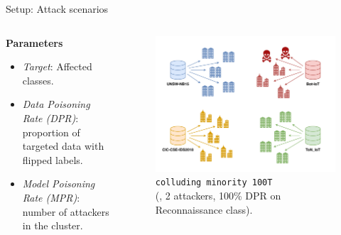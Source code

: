   \begin{frame}{Setup: Attack scenarios}
      \begin{columns}
          \begin{column}{.4\textwidth}
              \textbf{Parameters}
              \begin{itemize}
                  \item \textit{Target}: Affected classes.
                  \item \textit{Data Poisoning Rate (DPR)}: proportion of targeted data with flipped labels.
                  \item \textit{Model Poisoning Rate (MPR)}: number of attackers in the cluster.
              \end{itemize}
          \end{column}
          \begin{column}{.56\textwidth}
            \begin{figure}
              \captionsetup{font=small, labelfont=small}
              \includegraphics[width=\linewidth]{figures/radar/poisoning.pdf}%
              \captionsetup{justification=centering}
              \caption*{
                \texttt{colluding minority 100T}\\
                \smaller (\ie, 2 attackers, 100\% DPR on Reconnaissance class).
              }
            \end{figure}
          \end{column}
      \end{columns}
  \end{frame}

